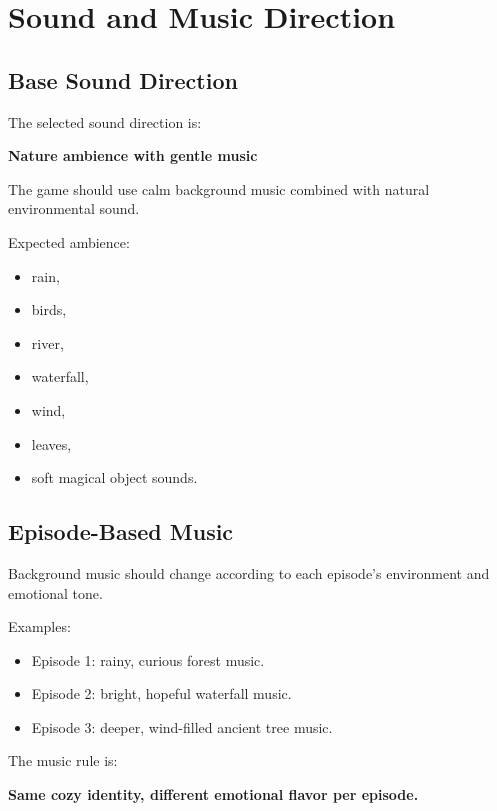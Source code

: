 \documentclass[12pt]{article}
\begin{document}
\section{Sound and Music Direction}

\subsection{Base Sound Direction}

The selected sound direction is:

\begin{center}
\textbf{Nature ambience with gentle music}
\end{center}

The game should use calm background music combined with natural environmental sound.

Expected ambience:

\begin{itemize}[leftmargin=*]
    \item rain,
    \item birds,
    \item river,
    \item waterfall,
    \item wind,
    \item leaves,
    \item soft magical object sounds.
\end{itemize}

\subsection{Episode-Based Music}

Background music should change according to each episode's environment and emotional tone.

Examples:

\begin{itemize}[leftmargin=*]
    \item Episode 1: rainy, curious forest music.
    \item Episode 2: bright, hopeful waterfall music.
    \item Episode 3: deeper, wind-filled ancient tree music.
\end{itemize}

The music rule is:

\begin{center}
\textbf{Same cozy identity, different emotional flavor per episode.}
\end{center}
\end{document}
